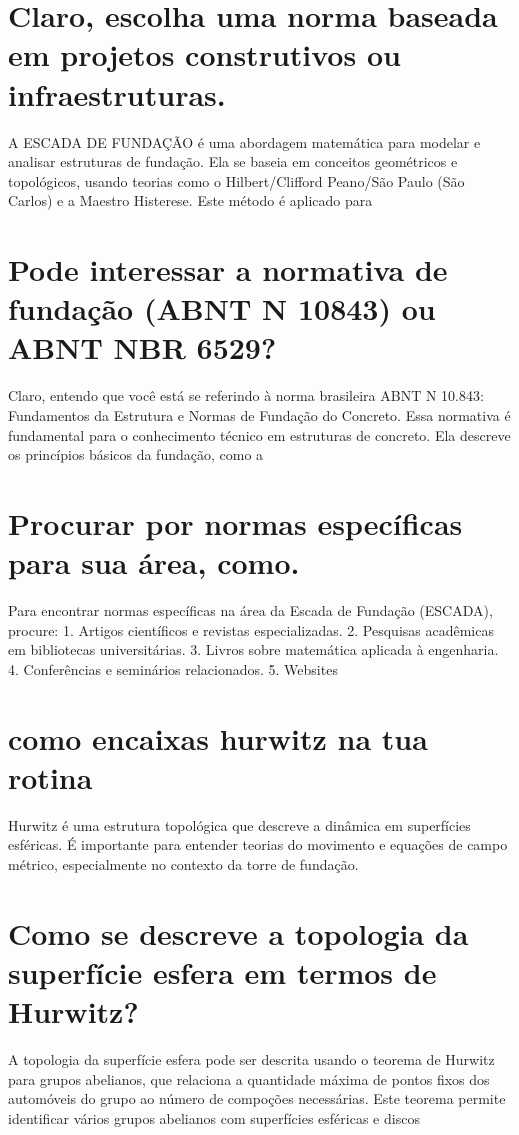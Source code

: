 \documentclass[11pt,a4paper]{article}
\begin{document}
\section{Claro, escolha uma norma baseada em projetos construtivos ou infraestruturas.}
A ESCADA DE FUNDAÇÃO é uma abordagem matemática para modelar e analisar estruturas de fundação. Ela se baseia em conceitos geométricos e topológicos, usando teorias como o Hilbert/Clifford Peano/São Paulo (São Carlos) e a Maestro Histerese. Este método é aplicado para

\section{Pode interessar a normativa de fundação (ABNT N 10843) ou ABNT NBR 6529?}
Claro, entendo que você está se referindo à norma brasileira ABNT N 10.843: Fundamentos da Estrutura e Normas de Fundação do Concreto. Essa normativa é fundamental para o conhecimento técnico em estruturas de concreto. Ela descreve os princípios básicos da fundação, como a

\section{Procurar por normas específicas para sua área, como.}
Para encontrar normas específicas na área da Escada de Fundação (ESCADA), procure: 1. Artigos científicos e revistas especializadas. 2. Pesquisas acadêmicas em bibliotecas universitárias. 3. Livros sobre matemática aplicada à engenharia. 4. Conferências e seminários relacionados. 5. Websites

\section{como encaixas hurwitz na tua rotina}
Hurwitz é uma estrutura topológica que descreve a dinâmica em superfícies esféricas. É importante para entender teorias do movimento e equações de campo métrico, especialmente no contexto da torre de fundação.

\section{Como se descreve a topologia da superfície esfera em termos de Hurwitz?}
A topologia da superfície esfera pode ser descrita usando o teorema de Hurwitz para grupos abelianos, que relaciona a quantidade máxima de pontos fixos dos automóveis do grupo ao número de compoções necessárias. Este teorema permite identificar vários grupos abelianos com superfícies esféricas e discos
\end{document}
